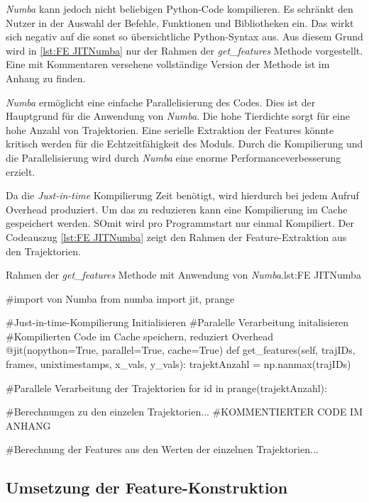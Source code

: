 \textit{Numba} kann jedoch nicht beliebigen Python-Code kompilieren. Es schränkt den Nutzer in der Auswahl der Befehle, Funktionen und Bibliotheken ein. Das wirkt sich negativ auf die sonst so übersichtliche Python-Syntax aus. Aus diesem Grund wird in \ref{lst:FE JITNumba} nur der Rahmen der \textit{get\_features} Methode vorgestellt. Eine mit Kommentaren versehene vollständige Version der Methode ist im Anhang zu finden. \par

\textit{Numba} ermöglicht eine einfache Parallelisierung des Codes. Dies ist der Hauptgrund für die Anwendung von \textit{Numba}. Die hohe Tierdichte sorgt für eine hohe Anzahl von Trajektorien. Eine serielle Extraktion der Features könnte kritisch werden für die Echtzeitfähigkeit des Moduls. Durch die Kompilierung und die Parallelisierung wird durch \textit{Numba} eine enorme Performanceverbesserung erzielt.\par

Da die \textit{Just-in-time} Kompilierung Zeit benötigt, wird hierdurch bei jedem Aufruf \gls{Overhead} produziert. Um das zu reduzieren kann eine Kompilierung im Cache gespeichert werden. SOmit wird pro Programmstart nur einmal Kompiliert. Der Codeauszug \ref{lst:FE JITNumba} zeigt den Rahmen der Feature-Extraktion aus den Trajektorien.

\begin{pythoncode}{Rahmen der \textit{get\_features} Methode mit Anwendung von \textit{Numba}.}{lst:FE JITNumba}

#import von Numba
from numba import jit, prange

#Just-in-time-Kompilierung Initialisieren
#Paralelle Verarbeitung initalisieren 
#Kompilierten Code im Cache speichern, reduziert Overhead
@jit(nopython=True, parallel=True, cache=True)
def get_features(self, trajIDs, frames, unixtimestamps, x_vals, y_vals):
    trajektAnzahl = np.nanmax(trajIDs)

    #Parallele Verarbeitung der Trajektorien 
    for id in prange(trajektAnzahl):

        #Berechnungen zu den einzelen Trajektorien...
        #KOMMENTIERTER CODE IM ANHANG

    #Berechnung der Features aus den Werten der einzelnen Trajektorien...

\end{pythoncode}


\subsection{Umsetzung der Feature-Konstruktion}